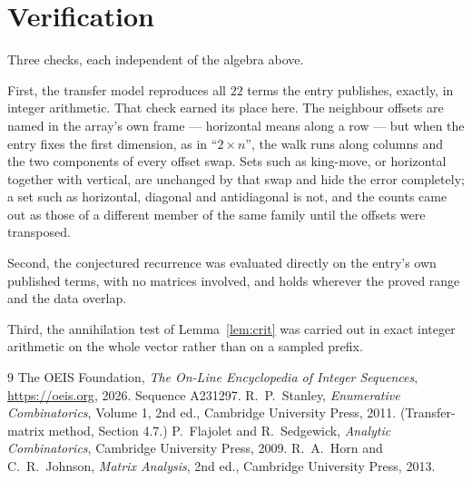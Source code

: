 \documentclass[11pt,a4paper]{article}
\theoremstyle{plain}
\theoremstyle{definition}
\begin{document}
\section{Verification}

Three checks, each independent of the algebra above.

First, the transfer model reproduces all $22$ terms the entry publishes, exactly, in
integer arithmetic. That check earned its place here. The neighbour offsets are named in the
array's own frame --- horizontal means along a row --- but when the entry fixes the first
dimension, as in ``$2\times n$'', the walk runs along columns and the two components of every
offset swap. Sets such as king-move, or horizontal together with vertical, are unchanged by
that swap and hide the error completely; a set such as horizontal, diagonal and antidiagonal
is not, and the counts came out as those of a different member of the same family until the
offsets were transposed.

Second, the conjectured recurrence was evaluated directly on the entry's own published terms,
with no matrices involved, and holds wherever the proved range and the data overlap.

Third, the annihilation test of Lemma~\ref{lem:crit} was carried out in exact integer
arithmetic on the whole vector rather than on a sampled prefix.

\begin{thebibliography}{9}
 The OEIS Foundation, \emph{The On-Line Encyclopedia of Integer
Sequences}, \url{https://oeis.org}, 2026. Sequence A231297.
 R.~P.~Stanley, \emph{Enumerative Combinatorics}, Volume 1, 2nd ed.,
Cambridge University Press, 2011. (Transfer-matrix method, Section 4.7.)
 P.~Flajolet and R.~Sedgewick, \emph{Analytic Combinatorics}, Cambridge
University Press, 2009.
 R.~A.~Horn and C.~R.~Johnson, \emph{Matrix Analysis}, 2nd ed., Cambridge
University Press, 2013.
\end{thebibliography}
\end{document}
